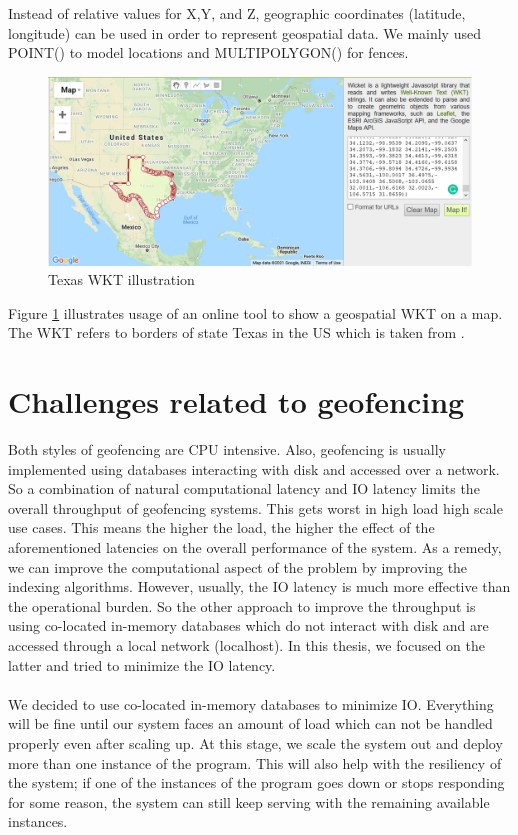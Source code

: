 \documentclass[a4]{report}
\begin{document}
    Instead of relative values for X,Y, and Z, geographic coordinates (latitude, longitude) can be used in order to
    represent geospatial data.
    We mainly used POINT() to model locations and MULTIPOLYGON() for fences.

    \begin{figure}[ht]
        \centering
        \caption{Texas WKT illustration}
        \label{fig:texas}
        \includegraphics[width=\linewidth, scale=0.5]{images/texas.png}
    \end{figure}
    Figure \ref{fig:texas} illustrates usage of an online tool \cite{WKTtool} to show a geospatial WKT on a map.
    The WKT refers to borders of state Texas in the US which is taken from \cite{WKTs}.


    \section{Challenges related to geofencing}
    Both styles of geofencing are CPU intensive.
    Also, geofencing is usually implemented using databases interacting with disk and accessed over a network.
    So a combination of natural computational latency and IO latency limits the overall throughput of geofencing systems.
    This gets worst in high load high scale use cases.
    This means the higher the load, the higher the effect of the aforementioned latencies on the overall performance of the system.
    As a remedy, we can improve the computational aspect of the problem by improving the indexing algorithms.
    However, usually, the IO latency is much more effective than the operational burden.
    So the other approach to improve the throughput is using co-located in-memory databases which do not interact with disk and are accessed through a local network (localhost).
    In this thesis, we focused on the latter and tried to minimize the IO latency.

    \paragraph{}
    We decided to use co-located in-memory databases to minimize IO.
    Everything will be fine until our system faces an amount of load which can not be handled properly even after scaling up.
    At this stage, we scale the system out and deploy more than one instance of the program.
    This will also help with the resiliency of the system;
    if one of the instances of the program goes down or stops responding for some reason, the system can still keep serving with the remaining available instances.
\end{document}
